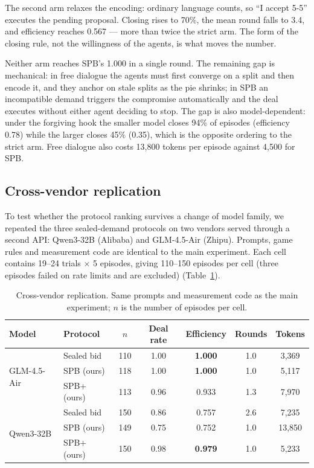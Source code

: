 \documentclass[11pt]{article}
\begin{document}
The second arm relaxes the encoding: ordinary language counts, so ``I accept 5-5'' executes the pending proposal. Closing rises to 70\%, the mean round falls to 3.4, and efficiency reaches 0.567 --- more than twice the strict arm. The form of the closing rule, not the willingness of the agents, is what moves the number.

Neither arm reaches SPB's 1.000 in a single round. The remaining gap is mechanical: in free dialogue the agents must first converge on a split and then encode it, and they anchor on stale splits as the pie shrinks; in SPB an incompatible demand triggers the compromise automatically and the deal executes without either agent deciding to stop. The gap is also model-dependent: under the forgiving hook the smaller model closes 94\% of episodes (efficiency 0.78) while the larger closes 45\% (0.35), which is the opposite ordering to the strict arm. Free dialogue also costs 13{,}800 tokens per episode against 4{,}500 for SPB.

\subsection{Cross-vendor replication}
\label{sec:crossvendor}

To test whether the protocol ranking survives a change of model family, we repeated the three sealed-demand protocols on two vendors served through a second API: Qwen3-32B (Alibaba) and GLM-4.5-Air (Zhipu). Prompts, game rules and measurement code are identical to the main experiment. Each cell contains 19--24 trials $\times$ 5 episodes, giving 110--150 episodes per cell (three episodes failed on rate limits and are excluded) (Table~\ref{tab:replication}).

\begin{table}[H]
\centering
\caption{Cross-vendor replication. Same prompts and measurement code as the main experiment; $n$ is the number of episodes per cell.}
\label{tab:replication}
\small
\begin{tabular}{@{}llccccc@{}}
\toprule
Model & Protocol & $n$ & Deal rate & Efficiency & Rounds & Tokens \\
\midrule
\multirow{3}{*}{GLM-4.5-Air}
 & Sealed bid & 110 & 1.00 & \textbf{1.000} & 1.0 & 3{,}369 \\
 & SPB (ours) & 118 & 1.00 & \textbf{1.000} & 1.0 & 5{,}117 \\
 & SPB+ (ours) & 113 & 0.96 & 0.933 & 1.3 & 7{,}970 \\
\midrule
\multirow{3}{*}{Qwen3-32B}
 & Sealed bid & 150 & 0.86 & 0.757 & 2.6 & 7{,}235 \\
 & SPB (ours) & 149 & 0.75 & 0.752 & 1.0 & 13{,}850 \\
 & SPB+ (ours) & 150 & 0.98 & \textbf{0.979} & 1.0 & 5{,}233 \\
\bottomrule
\end{tabular}
\end{table}
\end{document}
